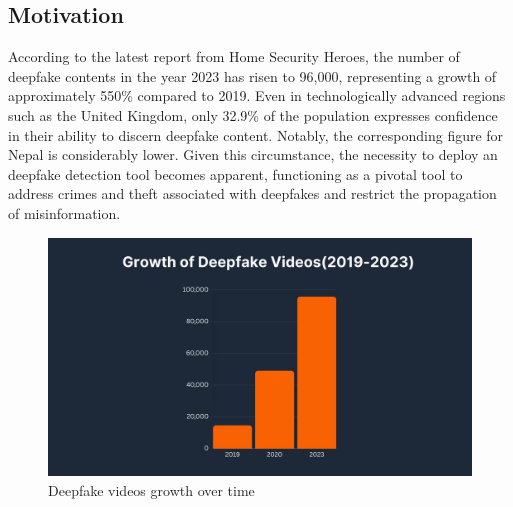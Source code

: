 \subsection{Motivation}
\noindent According to the latest report from Home Security Heroes, the number of deepfake contents in the year 2023 has risen to 96,000, representing a growth of approximately 550\% compared to 2019. Even in technologically advanced regions such as the United Kingdom, only 32.9\% of the population expresses confidence in their ability to discern deepfake content. Notably, the corresponding figure for Nepal is considerably lower. Given this circumstance, the necessity to deploy an deepfake detection tool becomes apparent, functioning as a pivotal tool to address crimes and theft associated with deepfakes and  restrict the propagation of misinformation.
\begin{figure}[h]
    \centering
    \includegraphics[width= 5.5in ]{img/chart.jpg}
    \caption{Deepfake videos growth over time}
\end{figure}
